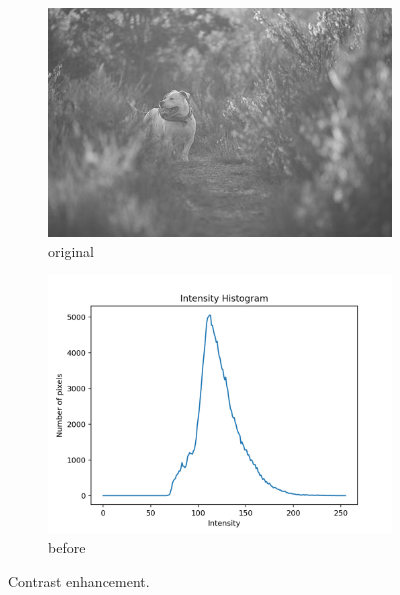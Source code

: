 \documentclass[11pt,a4paper]{article}
\begin{document}
\begin{figure}[ht]
	\ContinuedFloat*
	\centering
	\begin{subfigure}[h]{0.7\textwidth}
		\includegraphics[width=\textwidth]{figs/lc1_gray}
		\caption{original}
		\label{fig:lc1_orig}
	\end{subfigure}
	
	\begin{subfigure}[h]{0.75\textwidth}
		\includegraphics[width=\textwidth]{figs/lc1_hist_bef}
		\caption{before}
		\label{fig:hist_bef_1}
	\end{subfigure}
	
	\caption{Contrast enhancement.}
	\label{fig:eq1}
\end{figure}

\clearpage
\end{document}
